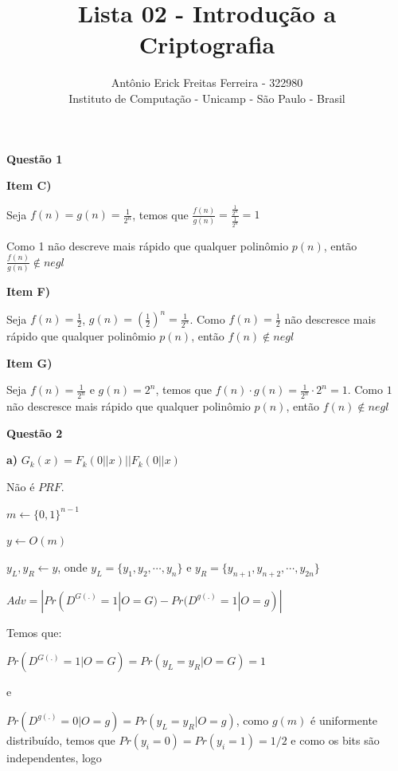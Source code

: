 \documentclass{article}
\title{Lista 02 - Introdução a Criptografia}
\author{Antônio Erick Freitas Ferreira - 322980\\
        \small Instituto de Computação - Unicamp - São Paulo - Brasil
}
\begin{document}
\maketitle

\textbf{Questão 1}

\textbf{Item C)}

    Seja $f(n) = g(n) = \frac{1}{2^n}$, temos que $\frac{f(n)}{g(n)} = \frac{\frac{1}{2^n}}{\frac{1}{2^n}} = 1$

    Como 1 não descreve mais rápido que qualquer polinômio $p(n)$, então $\frac{f(n)}{g(n)} \notin negl$

\textbf{Item F)}

    Seja $f(n) = \frac{1}{2}$, $g(n) = (\frac{1}{2})^n = \frac{1}{2^n}$. Como $f(n) = \frac{1}{2}$ não descresce mais rápido que qualquer polinômio $p(n)$, então $f(n) \notin negl$

\textbf{Item G)}

    Seja $f(n) = \frac{1}{2^n}$ e $g(n) = 2^n$, temos que $f(n) \cdot g(n) = \frac{1}{2^n} \cdot 2^n = 1$. Como $1$ não descresce mais rápido que qualquer polinômio $p(n)$, então $f(n) \notin negl$


\textbf{Questão 2}

\textbf{a)} $G_k(x) = F_k(0||x) || F_k(0||x)$

    Não é $PRF$.

        \begin{algorithm}[H]
            \caption{Distinguidor $D$}
            $m \leftarrow \{0,1\}^{n-1}$

            $y \leftarrow O(m)$
            
            $y_L, y_R \leftarrow y$, onde $y_L = \{y_1,y_2,\cdots,y_n \}$ e $y_R = \{y_{n+1},y_{n+2},\cdots,y_{2n} \}$

        \end{algorithm}

    $Adv = | Pr(D^{G(.)} = 1 | O = G) - Pr(D^{g(.)} = 1 | O = g) |$

    Temos que:

    $Pr(D^{G(.)} = 1 | O = G) = Pr(y_L = y_R | O = G) = 1$
    
    e

    $Pr(D^{g(.)} = 0 | O = g) = Pr(y_L = y_R | O = g)$, como $g(m)$ é uniformente distribuído, temos que $Pr(y_i = 0) = Pr(y_i = 1) = 1/2$ e como os bits são independentes, logo
    
\end{document}
